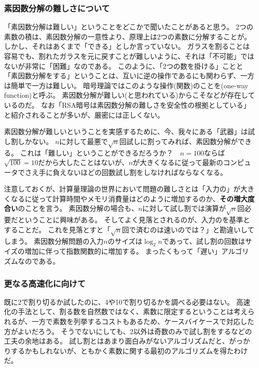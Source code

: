 
\subsubsection{素因数分解の難しさについて}
「素因数分解は難しい」ということをどこかで聞いたことがあると思う。
2つの素数の積は、素因数分解の一意性より、原理上は2つの素数に分解することが。
しかし、それはあくまで「できる」としか言っていない。
ガラスを割ることは容易でも、割れたガラスを元に戻すことが難しいように、それは「不可能」ではないが非常に「困難」なのである。
このように、「2つの数を掛ける」ことと「素因数分解をする」ということは、互いに逆の操作であるにも関わらず、一方は簡単で一方は難しい。
暗号理論ではこのような操作(関数)のことを(one-way function)と呼ぶ。
素因数分解が難しい(と思われている)からこそなどが存在しているのだ。
なお「RSA暗号は素因数分解の難しさを安全性の根拠としている」と紹介されることが多いが、厳密には正しくない。

素因数分解が難しいということを実感するために、今、我々にある「武器」は試し割しかない。
$n$に対して最悪で$\sqrt{n}$回試しに割ってみれば、素因数分解ができる。
これは「難しい」ということができるだろうか？　$n=100$ならば$\sqrt{100}=10$だから大したことはないが、$n$が大きくなるに従って最新のコンピュータでさえ手に負えないほどの回数試し割をしなければならなくなる。

注意しておくが、計算量理論の世界において問題の難しさとは「入力の」が大きくなるに従って計算時間やメモリ消費量はどのように増加するのか、\textbf{その増大度合い}のことを言う。
素因数分解の場合も、$n$に対して試し割では演算が$\sqrt{n}$回必要だということに興味がある。
そしてよく見落とされるのが、入力のを基準とすることだ。
これを見落とすと「$\sqrt{n}$回で済むのは速いのでは？」と勘違いしてしまう。
素因数分解問題の入力$n$のサイズは$\log_2{n}$であって、試し割の回数はサイズの増加に伴って指数関数的に増加する。
まったくもって「遅い」アルゴリズムなのである。

\subsubsection{更なる高速化に向けて}
既に2で割り切るか試したのに、4や10で割り切るかを調べる必要はない。
高速化の手法として、割る数を自然数ではなく、素数に限定するということは考えられるが、一方で素数を列挙するコストもあるため、ケースバイケースで対応した方がよいだろう。
そうでないにしても、2以外は奇数のみで試し割をするなどの工夫の余地はある。
試し割とはあまり面白みがないアルゴリズムだと、がっかりするかもしれないが、ともかく素数に関する最初のアルゴリズムを得たわけだ。

